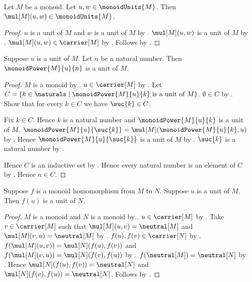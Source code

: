 \begin{corollary}\label{monoid_units_closed_under_product}
    Let $M$ be a monoid.
    Let $u,w\in\monoidUnits{M}$.
    Then $\mul[M](u,w)\in\monoidUnits{M}$.
\end{corollary}
\begin{proof}
    $u$ is a unit of $M$ and $w$ is a unit of $M$ by
        .
    $\mul[M](u,w)$ is a unit of $M$ by
        .
    $\mul[M](u,w)\in\carrier[M]$ by
        .
    Follows by .
\end{proof}

\begin{theorem}\label{monoid_unit_power}
    Suppose $u$ is a unit of $M$.
    Let $n$ be a natural number.
    Then $\monoidPower{M}{u}{n}$ is a unit of $M$.
\end{theorem}
\begin{proof}
    $M$ is a monoid by .
    $u\in\carrier[M]$ by .
    Let $C=\{k\in\naturals\mid
        \text{$\monoidPower{M}{u}{k}$ is a unit of $M$}\}$.
    $\emptyset\in C$ by
        .
    Show that for every $k\in C$ we have $\suc{k}\in C$.
    \begin{subproof}
        Fix $k\in C$.
        Hence $k$ is a natural number and
            $\monoidPower{M}{u}{k}$ is a unit of $M$.
        $\monoidPower{M}{u}{\suc{k}}=
            \mul[M](\monoidPower{M}{u}{k},u)$ by
            .
        Hence $\monoidPower{M}{u}{\suc{k}}$ is a unit of $M$ by
            .
        $\suc{k}$ is a natural number by .
    \end{subproof}
    Hence $C$ is an inductive set by .
    Hence every natural number is an element of $C$ by
        .
    Hence $n\in C$.
\end{proof}

\begin{theorem}\label{monoid_hom_preserves_unit}
    Suppose $f$ is a monoid homomorphism from $M$ to $N$.
    Suppose $u$ is a unit of $M$.
    Then $f(u)$ is a unit of $N$.
\end{theorem}
\begin{proof}
    $M$ is a monoid and $N$ is a monoid by
        .
    $u\in\carrier[M]$ by .
    Take $v\in\carrier[M]$ such that
        $\mul[M](u,v)=\neutral[M]$ and
        $\mul[M](v,u)=\neutral[M]$ by
        .
    $f(u),f(v)\in\carrier[N]$ by
        .
    $f(\mul[M](u,v))=\mul[N](f(u),f(v))$ and
        $f(\mul[M](v,u))=\mul[N](f(v),f(u))$ by
        .
    $f(\neutral[M])=\neutral[N]$ by .
    Hence $\mul[N](f(u),f(v))=\neutral[N]$ and
        $\mul[N](f(v),f(u))=\neutral[N]$.
    Follows by .
\end{proof}

